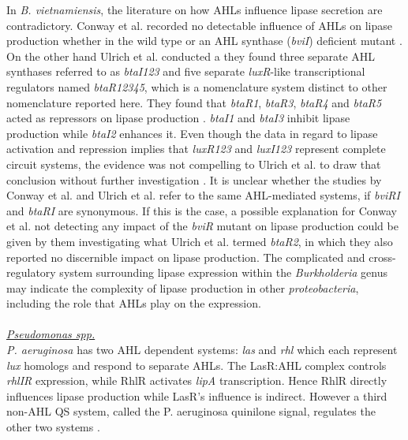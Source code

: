 \documentclass{article}
\begin{document}
In \emph{B. vietnamiensis}, the literature on how AHLs influence lipase secretion are contradictory. Conway et al. recorded no detectable influence of AHLs on lipase production whether in the wild type or an AHL synthase (\emph{bviI}) deficient mutant \cite{conway_02}. On the other hand Ulrich et al. conducted a they found three separate AHL synthases referred to as \emph{btaI123} and five separate \emph{luxR}-like transcriptional regulators named \emph{btaR12345}, which is a nomenclature system distinct to other nomenclature reported here. They found that \emph{btaR1}, \emph{btaR3}, \emph{btaR4} and \emph{btaR5} acted as repressors on lipase production \cite{ulrich2004}. \emph{btaI1} and \emph{btaI3} inhibit lipase production while \emph{btaI2} enhances it. Even though the data in regard to lipase activation and repression implies that \emph{luxR123} and \emph{luxI123} represent complete circuit systems, the evidence was not compelling to Ulrich et al. to draw that conclusion without further investigation \cite{ulrich2004}.
It is unclear whether the studies by Conway et al. and Ulrich et al. refer to the same AHL-mediated systems, if \emph{bviRI} and \emph{btaRI} are synonymous. If this is the case, a possible explanation for Conway et al. not detecting any impact of the \emph{bviR} mutant on lipase production could be given by them investigating what Ulrich et al. termed \emph{btaR2}, in which they also reported no discernible impact on lipase production. 
The complicated and cross-regulatory system surrounding lipase expression within the \emph{Burkholderia} genus may indicate the complexity of lipase production in other \emph{proteobacteria}, including the role that AHLs play on the expression.
\\
\\ \emph{\underline{Pseudomonas spp.}}
\\ \emph{P. aeruginosa} has two AHL dependent systems: \emph{las} and \emph{rhl} which each represent \emph{lux} homologs and respond to separate AHLs. The LasR:AHL complex controls \emph{rhlIR} expression, while RhlR activates \emph{lipA} transcription. Hence RhlR directly influences lipase production while LasR's influence is indirect. However a third non-AHL QS system, called the P. aeruginosa quinilone signal, regulates the other two systems \cite{juhas2005}. 
\end{document}
